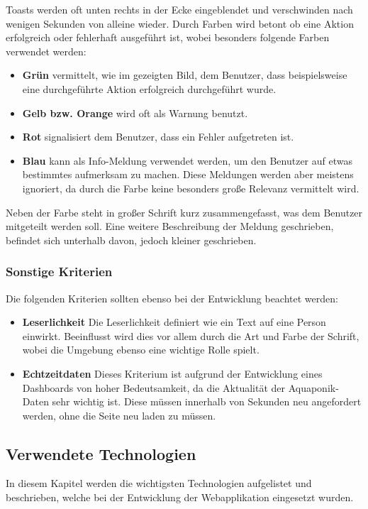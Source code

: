 \clearpage
Toasts werden oft unten rechts in der Ecke eingeblendet und verschwinden nach wenigen Sekunden von alleine wieder. Durch Farben wird betont ob eine Aktion erfolgreich oder fehlerhaft ausgeführt ist, wobei besonders folgende Farben verwendet werden:

\begin{itemize}
    \item \textbf{Grün} vermittelt, wie im gezeigten Bild, dem Benutzer, dass beispielsweise eine durchgeführte Aktion erfolgreich durchgeführt wurde.
    \item \textbf{Gelb bzw. Orange} wird oft als Warnung benutzt.
    \item \textbf{Rot} signalisiert dem Benutzer, dass ein Fehler aufgetreten ist.
    \item \textbf{Blau} kann als Info-Meldung verwendet werden, um den Benutzer auf etwas bestimmtes aufmerksam zu machen. Diese Meldungen werden aber meistens ignoriert, da durch die Farbe keine besonders große Relevanz vermittelt wird.
\end{itemize}

Neben der Farbe steht in großer Schrift kurz zusammengefasst, was dem Benutzer mitgeteilt werden soll. Eine weitere Beschreibung der Meldung geschrieben, befindet sich unterhalb davon, jedoch kleiner geschrieben.

\subsubsection{Sonstige Kriterien}
Die folgenden Kriterien sollten ebenso bei der Entwicklung beachtet werden:

\begin{itemize}
\item \textbf{Leserlichkeit}
Die Leserlichkeit definiert wie ein Text auf eine Person einwirkt. Beeinflusst wird dies vor allem durch die Art und Farbe der Schrift, wobei die Umgebung ebenso eine wichtige Rolle spielt.


\item \textbf{Echtzeitdaten}
Dieses Kriterium ist aufgrund der Entwicklung eines Dashboards von hoher Bedeutsamkeit, da die Aktualität der Aquaponik-Daten sehr wichtig ist. Diese müssen innerhalb von Sekunden neu angefordert werden, ohne die Seite neu laden zu müssen.
\end{itemize}
\clearpage
\subsection{Verwendete Technologien}
\label{sec:techs}
In diesem Kapitel werden die wichtigsten Technologien aufgelistet und beschrieben, welche bei der Entwicklung der Webapplikation eingesetzt wurden.
